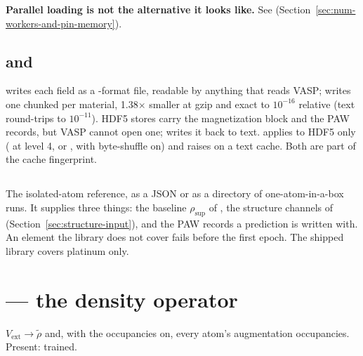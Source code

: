 \textbf{Parallel loading is not the alternative it looks like.} See  (Section~\ref{sec:num-workers-and-pin-memory}).

\subsection{ and }

 writes each field as a -format file, readable by anything that reads VASP;  writes one chunked  per material, 1.38$\times$ smaller at gzip and exact to $10^{-16}$ relative (text round-trips to $10^{-11}$). HDF5 stores carry the magnetization block and the PAW records, but VASP cannot open one;  writes it back to text.  applies to HDF5 only ( at level 4, or , with byte-shuffle on) and raises on a text cache. Both are part of the cache fingerprint.

\subsection{}

The isolated-atom reference, as a  JSON or as a directory of one-atom-in-a-box runs. It supplies three things: the baseline $\rho_\mathrm{sup}$ of , the structure channels of  (Section~\ref{sec:structure-input}), and the PAW records a prediction is written with. An element the library does not cover fails before the first epoch. The shipped library covers platinum only.

\section{ --- the density operator}

$V_\mathrm{ext} \to \tilde\rho$ and, with the occupancies on, every atom's augmentation occupancies. Present: trained.

